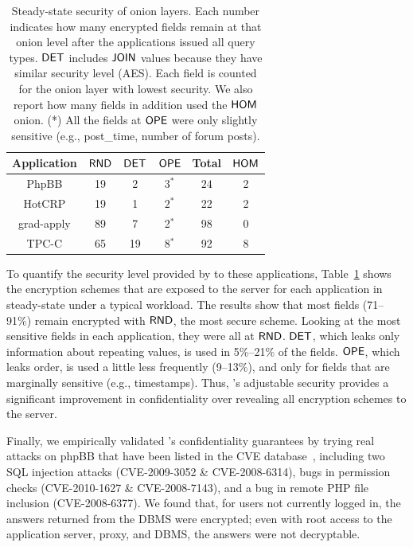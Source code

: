 \begin{table}
\begin{tabular}{@{}c|c|c|c||c||c@{}}
\bf Application & 	\bf $\mathsf{RND}$ & 	\bf $\mathsf{DET}$ & 	\bf $\mathsf{OPE}$ & 	\bf Total & 	$\mathsf{HOM}$ \\
\hline
PhpBB &          19   &   		 2    &    		 $3^*$  &   		 $24$ & 		2  \\
HotCRP &	 	19 & 		1 & 			$2^*$ & 	 		22 &  	2 \\
grad-apply & 	 89& 		7  & 			2$^*$  & 		98 &  	0 \\
TPC-C & 		65 & 		19 &  		8$^*$ & 			92 & 		8
\end{tabular}
\caption{Steady-state security of onion layers. Each number indicates how many encrypted fields remain at that onion level after the applications issued all query types. $\mathsf{DET}$ includes $\mathsf{JOIN}$ values because they have similar security level (AES). Each field is counted for the onion layer with lowest security. We also report how many fields in addition used the $\mathsf{HOM}$ onion. (*) All the fields at $\mathsf{OPE}$ were only slightly sensitive (e.g., post\_time, number of forum posts).} 
\label{t:onion}
\end{table}



To quantify the security level provided by \name to these
applications, Table~\ref{t:onion} shows the encryption schemes that
are exposed to the server for each application in steady-state under a
typical workload.  The results show that most fields (71--91\%) remain
encrypted with $\mathsf{RND}$, the most secure scheme. Looking at the most
sensitive fields in each application, they were all at $\mathsf{RND}$. $\mathsf{DET}$,
which leaks only information about repeating values, is used in
5\%--21\% of the fields.  $\mathsf{OPE}$, which leaks order, is used a little
less frequently (9--13\%), and only for fields that are marginally
sensitive (e.g., timestamps).  Thus, \name's adjustable security
provides a significant improvement in confidentiality over revealing
all encryption schemes to the server.

Finally, we empirically validated \name's confidentiality guarantees
by trying real attacks on phpBB that have been listed in the CVE
database~\cite{cve:stats}, including two SQL injection attacks
(CVE-2009-3052 \& CVE-2008-6314), bugs in permission checks
(CVE-2010-1627 \& CVE-2008-7143), and a bug in remote PHP file
inclusion (CVE-2008-6377).  We found that, for users not currently
logged in, the answers returned from the DBMS were encrypted; even
with root access to the application server, proxy, and DBMS, the
answers were not decryptable.

